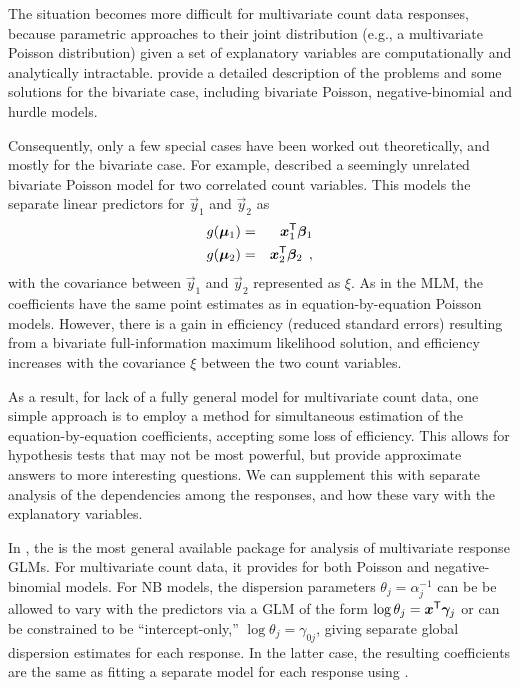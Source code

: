 \documentclass[11pt]{book}\usepackage[]{graphicx}\usepackage[]{color}
\begin{document}
The situation becomes more difficult for multivariate count data responses, because parametric approaches to
their joint distribution (e.g., a multivariate Poisson distribution)
given a set of explanatory variables are computationally and analytically intractable.
\citet[]{CameronTrivedi:2013} provide a detailed description of the problems and some solutions for
the bivariate case, including bivariate Poisson, negative-binomial and hurdle models.

Consequently, only a few special cases have been worked out theoretically, and mostly for the
bivariate case. For example, \cite{King:1989} described a seemingly unrelated bivariate Poisson model
for two correlated count variables. This models the separate linear predictors for $\vec{y}_1$ and
$\vec{y}_2$ as
\begin{eqnarray*}
g(\bm{\mu}_1) & = & \bm{x}_1 ^\mathsf{T} \bm{\beta}_1 \\
g(\bm{\mu}_2) & = & \bm{x}_2 ^\mathsf{T} \bm{\beta}_2       \:\: ,
\end{eqnarray*}
with the covariance between $\vec{y}_1$ and
$\vec{y}_2$ represented as $\xi$. As in the MLM, the coefficients have the same point estimates as
in equation-by-equation Poisson models.  However, there is a gain in efficiency (reduced standard errors)
resulting from a bivariate full-information maximum likelihood solution, and efficiency increases with the
covariance $\xi$ between the two count variables.

As a result, for lack of a fully general model for multivariate count data, one simple approach is to
employ a method for simultaneous estimation of the equation-by-equation coefficients, accepting some loss
of efficiency. This allows for hypothesis tests that may not be most powerful, but provide 
approximate answers to more interesting questions.  We can supplement this with separate analysis
of the dependencies among the responses, and how these vary with the explanatory variables.

In \R, the  is the most general available package for analysis of multivariate response GLMs.
For multivariate count data, it provides for both Poisson and negative-binomial models.  For NB
models, the dispersion parameters $\theta_j = \alpha_j^{-1}$ can be be allowed to vary with the
predictors via a GLM  of the form
$\log \theta_j = \bm{x}^\mathsf{T} \bm{\gamma}_j$
or can be constrained to be ``intercept-only,''
$\log \theta_j = \gamma_{0j}$,
giving separate global dispersion estimates for each response.
In the latter case, the resulting coefficients are the same as fitting a separate model for
each response using .
\end{document}
